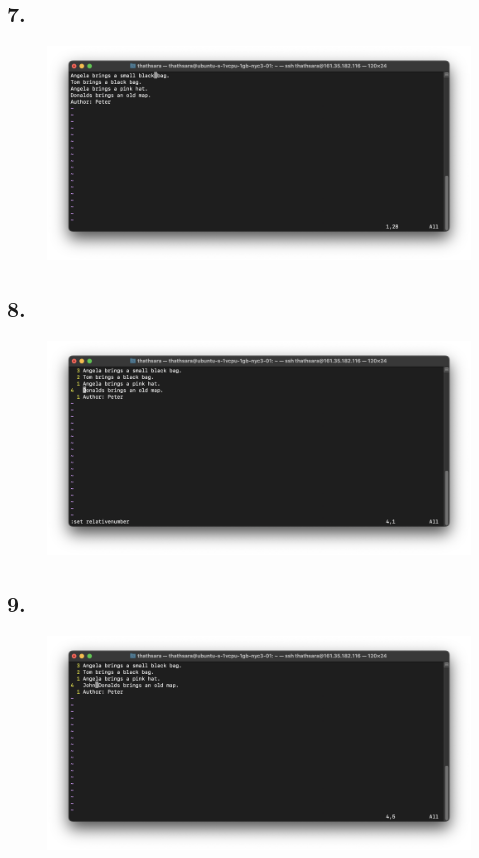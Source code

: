 \documentclass{article}
\begin{document}
    \subsection*{7.}
    \begin{figure}[H]
        \centering
        \includegraphics[width=\textwidth]{2/7.png}
    \end{figure}

    \subsection*{8.}
    \begin{figure}[H]
        \centering
        \includegraphics[width=\textwidth]{2/8.png}
    \end{figure}

    \subsection*{9.}
    \begin{figure}[H]
        \centering
        \includegraphics[width=\textwidth]{2/9.png}
    \end{figure}
\end{document}
